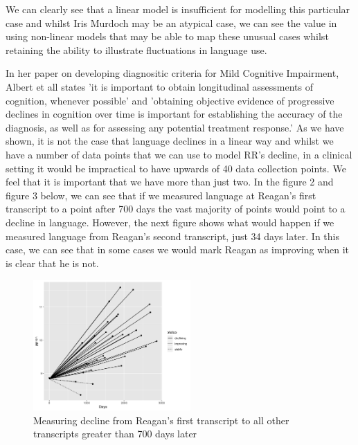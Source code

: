\documentclass[12pt]{article}
\begin{document}
We can clearly see that a linear model is insufficient for modelling this particular case and whilst Iris Murdoch may be an atypical case, we can see the value in using non-linear models that may be able to map these unusual cases whilst retaining the ability to illustrate fluctuations in language use.
\par
In her paper on developing diagnositic criteria for Mild Cognitive Impairment, Albert et all \cite{Albert2011} states 'it is important to obtain longitudinal assessments of cognition, whenever possible' and 'obtaining objective evidence of progressive declines in cognition over time is important for establishing the accuracy of the diagnosis, as well as for
assessing any potential treatment response.' As we have shown, it is not the case that language declines in a linear way and whilst we have a number of data points that we can use to model RR's decline, in a clinical setting it would be impractical to have upwards of 40 data collection points. We feel that  it is important that we have more than just two. In the figure 2 and figure 3 below, we can see that if we measured language at Reagan's first transcript to a point after 700 days the vast majority of points would point to a decline in language. However, the next figure shows what would happen if we measured language from Reagan's second transcript, just 34 days later. In this case, we can see that in some cases we would mark Reagan as improving when it is clear that he is not.

\begin{figure}[H]
	\centering
	\includegraphics[width=6cm, height=5cm]{plots/comp1.png}
	\caption{Measuring decline from Reagan's first transcript to all other transcripts greater than 700 days later}
\end{figure}
\end{document}

